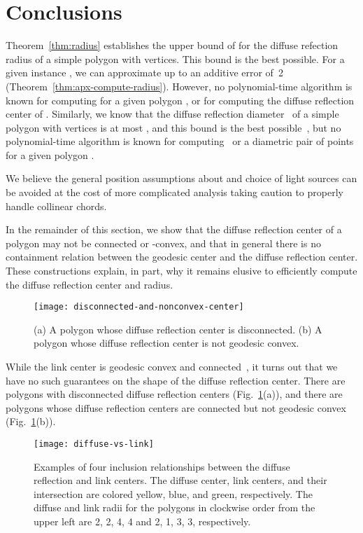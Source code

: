 \documentclass[12pt]{article}
\begin{document}
\section{Conclusions}
\label{sec:con}

Theorem~\ref{thm:radius} establishes the upper bound of  for the diffuse refection radius  of a simple polygon  with  vertices. This bound is the best possible. For a given instance , we can approximate  up to an additive error of~2 (Theorem~\ref{thm:apx-compute-radius}). However, no polynomial-time algorithm is known for computing  for a given polygon , or for computing the diffuse reflection center of . Similarly, we know that the diffuse reflection diameter~ of a simple polygon with  vertices is at most , and this bound is the best possible~\cite{Us}, but no polynomial-time algorithm is known for computing~ or a diametric pair of points for a given polygon .

We believe the general position assumptions about  and choice of light sources
  can be avoided at the cost of more complicated analysis taking
  caution to properly handle collinear chords.

In the remainder of this section, we show that the diffuse reflection center of a polygon  may not be connected or -convex, and that in general there is no containment relation between the geodesic center and the diffuse reflection center. These constructions explain, in part, why it remains elusive to efficiently compute the diffuse reflection center and radius.

 \begin{figure}[htbp]
    \centering
    \texttt{[image: disconnected-and-nonconvex-center]}
    \caption{(a) A polygon whose diffuse reflection center is disconnected.
    (b) A polygon whose diffuse reflection center is not geodesic convex.}
    \label{fig:disconnected-center}
  \end{figure}

\smallskip
{}
While the link center is geodesic convex and connected~\cite{LPS+88}, it turns out
that we have no such guarantees on the shape of the diffuse reflection center.
There are polygons with disconnected diffuse reflection centers (Fig.~\ref{fig:disconnected-center}(a)),
and there are polygons whose diffuse reflection centers are connected but not geodesic convex (Fig.~\ref{fig:disconnected-center}(b)).

\begin{figure}[hb!]
    \centering
    \texttt{[image: diffuse-vs-link]}
    \caption{Examples of four inclusion relationships between the diffuse reflection and link centers.
    The diffuse center, link centers, and their intersection are colored yellow, blue, and green, respectively.
    The diffuse and link radii for the polygons in clockwise order from the upper left are 2, 2, 4, 4 and 2, 1, 3, 3, respectively.}
    \label{fig:diffuse-vs-link}
\end{figure}
\end{document}
